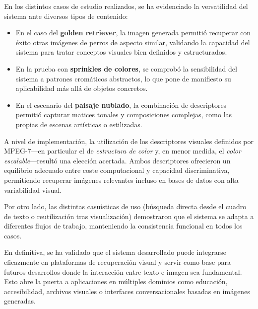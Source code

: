 En los distintos casos de estudio realizados, se ha evidenciado la versatilidad del sistema ante diversos tipos de contenido:

\begin{itemize}
    \item En el caso del \textbf{golden retriever}, la imagen generada permitió recuperar con éxito otras imágenes de perros de aspecto similar, validando la capacidad del sistema para tratar conceptos visuales bien definidos y estructurados.
    \item En la prueba con \textbf{sprinkles de colores}, se comprobó la sensibilidad del sistema a patrones cromáticos abstractos, lo que pone de manifiesto su aplicabilidad más allá de objetos concretos.
    \item En el escenario del \textbf{paisaje nublado}, la combinación de descriptores permitió capturar matices tonales y composiciones complejas, como las propias de escenas artísticas o estilizadas.
\end{itemize}

A nivel de implementación, la utilización de los descriptores visuales definidos por MPEG-7—en particular el de \textit{estructura de color} y, en menor medida, el \textit{color escalable}—resultó una elección acertada. Ambos descriptores ofrecieron un equilibrio adecuado entre coste computacional y capacidad discriminativa, permitiendo recuperar imágenes relevantes incluso en bases de datos con alta variabilidad visual.

Por otro lado, las distintas casuísticas de uso (búsqueda directa desde el cuadro de texto o reutilización tras visualización) demostraron que el sistema se adapta a diferentes flujos de trabajo, manteniendo la consistencia funcional en todos los casos.

En definitiva, se ha validado que el sistema desarrollado puede integrarse eficazmente en plataformas de recuperación visual y servir como base para futuros desarrollos donde la interacción entre texto e imagen sea fundamental. Esto abre la puerta a aplicaciones en múltiples dominios como educación, accesibilidad, archivos visuales o interfaces conversacionales basadas en imágenes generadas.
